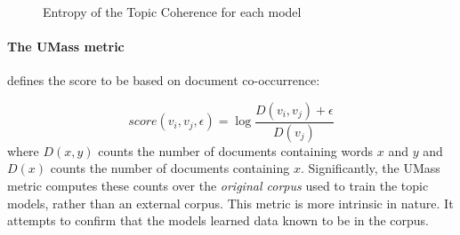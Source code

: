 \begin{figure}[h!t!b!]
  \centering
  \caption{Entropy of the Topic Coherence for each model}
  \label{fig:entropy}
\end{figure}

\paragraph{The UMass metric} defines the score to be based on document co-occurrence:

$$score(v_i, v_j,\epsilon) = \log \frac{D(v_i, v_j) + \epsilon}{D(v_j)}$$
\noindent
where $D(x,y)$ counts the number of documents containing words $x$ and $y$ and
$D(x)$ counts the number of documents containing $x$. Significantly, the UMass
metric computes these counts over the \textit{original corpus} used to train the
topic models, rather than an external corpus.  This metric is more intrinsic in
nature.  It attempts to confirm that the models learned data known to be in the
corpus.
